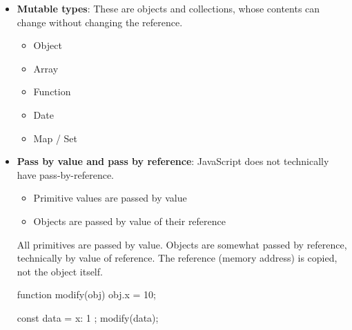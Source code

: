 \documentclass{report}
\begin{document}
\begin{itemize}
\begin{itemize}
                        \item bigint
                    \end{itemize}
                    \bigbreak \noindent 
                    \begin{jscode}
                        let s = "hello";
                        s[0] = "H";   // No effect
                        console.log(s); // "hello"
                    \end{jscode}
                \item \textbf{Mutable types}:  These are objects and collections, whose contents can change without changing the reference.
                    \begin{itemize}
                        \item Object	
                        \item Array	
                        \item Function	
                        \item Date	
                        \item Map / Set
                    \end{itemize}
                \item \textbf{Pass by value and pass by reference}: JavaScript does not technically have pass-by-reference.
                    \begin{itemize}
                        \item Primitive values are passed by value
                        \item Objects are passed by value of their reference
                    \end{itemize}
                    All primitives are passed by value. 
                    \bigbreak \noindent 
                    Objects are somewhat passed by reference, technically by value of reference. The reference (memory address) is copied, not the object itself.
                    \bigbreak \noindent 
                    \begin{jscode}
                        function modify(obj) {
                            obj.x = 10;
                        }

                        const data = { x: 1 };
                        modify(data);


\end{jscode}
\end{itemize}
\end{document}
